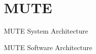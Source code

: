 \section{MUTE}

\begin{frame}{MUTE System Architecture}
    \vspace{-0.5cm}
    \begin{figure}
    \end{figure}
\end{frame}


\begin{frame}{MUTE Software Architecture}
    \vspace{-0.5cm}
    \begin{figure}
    \end{figure}
\end{frame}


